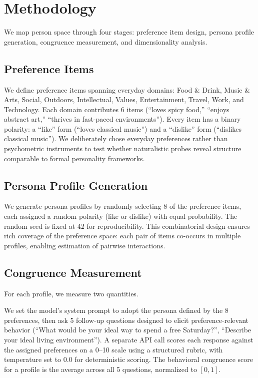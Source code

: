 \section{Methodology}
\label{sec:method}

We map person space through four stages: preference item design, persona profile generation, congruence measurement, and dimensionality analysis.

\subsection{Preference Items}
\label{sec:items}

We define \nprefs{} preference items spanning \ndomains{} everyday domains: Food \& Drink, Music \& Arts, Social, Outdoors, Intellectual, Values, Entertainment, Travel, Work, and Technology.
Each domain contributes 6 items (\eg ``loves spicy food,'' ``enjoys abstract art,'' ``thrives in fast-paced environments'').
Every item has a binary polarity: a ``like'' form (\eg ``loves classical music'') and a ``dislike'' form (\eg ``dislikes classical music'').
We deliberately chose everyday preferences rather than psychometric instruments to test whether naturalistic probes reveal structure comparable to formal personality frameworks.

\subsection{Persona Profile Generation}
\label{sec:profiles}

We generate \nprofiles{} persona profiles by randomly selecting 8 of the \nprefs{} preference items, each assigned a random polarity (like or dislike) with equal probability.
The random seed is fixed at 42 for reproducibility.
This combinatorial design ensures rich coverage of the preference space: each pair of items co-occurs in multiple profiles, enabling estimation of pairwise interactions.

\subsection{Congruence Measurement}
\label{sec:congruence}

For each profile, we measure two quantities.

We set the model's system prompt to adopt the persona defined by the 8 preferences, then ask 5 follow-up questions designed to elicit preference-relevant behavior (\eg ``What would be your ideal way to spend a free Saturday?'', ``Describe your ideal living environment'').
A separate API call scores each response against the assigned preferences on a 0--10 scale using a structured rubric, with temperature set to 0.0 for deterministic scoring.
The behavioral congruence score for a profile is the average across all 5 questions, normalized to $[0, 1]$.

